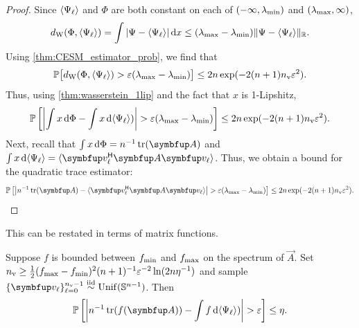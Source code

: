 \begin{proof}
    Since \( \langle  \Psi_\ell  \rangle \) and \( \Phi\) are both constant on each of \( (-\infty , \lambda_{\textup{min}} ) \) and \( ( \lambda_{\textup{max}} ,\infty) \), 
\begin{equation*}
    d_{\mathrm{W}}(\Phi,\langle \Psi_\ell \rangle)
    = \int | \Psi - \langle \Psi_\ell \rangle | \,\textup{d}{x}
    \leq (\lambda_{\textup{max}} - \lambda_{\textup{min}}) \| \Psi - \langle \Psi_\ell \rangle \|_{\mathbb{R}}.
\end{equation*}
Using \cref{thm:CESM_estimator_prob},
we find that
\begin{equation*}
    \mathbb{P}\big[ d_{\mathrm{W}}(\Phi,\langle \Psi_\ell \rangle) > \varepsilon (\lambda_{\textup{max}}-\lambda_{\textup{min}}) \big] 
    \leq 2 n \exp (- 2( n+1 ) n_{\textup{v}} \varepsilon^2 ).
\end{equation*}
    Thus, using \cref{thm:wasserstein_1lip} and the fact that \( x \) is 1-Lipshitz, 
\begin{equation*}
    \mathbb{P}\left[ \left| \int x \,\textup{d}\Phi - \int x \,\textup{d}\langle \Psi_\ell \rangle) \right| > \varepsilon (\lambda_{\textup{max}}-\lambda_{\textup{min}}) \right] 
    \leq 2 n \exp (- 2( n+1 ) n_{\textup{v}} \varepsilon^2 ).
\end{equation*}
Next, recall that \( \int x \,\d\Phi = n^{-1} \tr(\vec{A}) \) and \( \int x \,\d\samp{\Psi_\ell} = \samp{ \vec{v}_{\ell}^\cT \vec{A} \vec{v}_\ell } \).
Thus, we obtain a bound for the quadratic trace estimator:
\begin{equation*}
    \PP\left[ \left| n^{-1} \tr(\vec{A}) - \samp{ \vec{v}_{\ell}^\cT \vec{A} \vec{v}_\ell } \right| > \varepsilon (\lmax - \lmin) \right] 
    \leq 2 n \exp (- 2( n+1 ) \nv \varepsilon^2 ). \qedhere
\end{equation*}
\end{proof}

This can be restated in terms of matrix functions.
\begin{corollary}
    \label{thm:wCESM_tr}
    Suppose \( f \) is bounded between \( f_{\textup{min}} \) and \( f_{\textup{max}} \) on the spectrum of \( \vec{A} \). 
    Set \( n_{\textup{v}} \geq \frac{1}{2}( f_{\textup{max}} - f_{\textup{min}} )^2 (n+1)^{-1} \varepsilon^{-2} \ln(2n \eta^{-1}) \) and sample \( \{ \vec{v}_{\ell} \}_{\ell=0}^{\nv-1} \stackrel{\textup{iid}}{\sim} \operatorname{Unif}(\mathbb{S}^{n-1}) \).
    Then
    \begin{equation*}
        \PP\left[ \left| n^{-1} \tr(\fA) - \int f \,\d\samp{\Psi_\ell}) \right| > \varepsilon \right] \leq \eta.
    \end{equation*}
\end{corollary}

